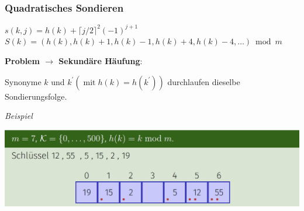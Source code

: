\vspace{-4pt}
\begin{sectionbox}
\subsubsection{Quadratisches Sondieren}\par\smallskip
\begin{center}
    $s(k, j)=h(k)+\lceil j / 2\rceil^{2}(-1)^{j+1}$
    $S(k)=(h(k), h(k)+1, h(k)-1, h(k)+4, h(k)-4, \ldots) \bmod m$
\end{center}\par\smallskip
\textbf{Problem $\rightarrow$ Sekundäre Häufung}:\par Synonyme $k$ und $k^{\prime}\left(\operatorname{mit} h(k)=h\left(k^{\prime}\right)\right)$ durchlaufen dieselbe Sondierungsfolge.\par\smallskip
\textit{Beispiel}\par
\begin{center}
    \includegraphics[width = 0.9\columnwidth]{../img/BspQuadSond.png}
\end{center}
\end{sectionbox}
\vspace{-4pt}
